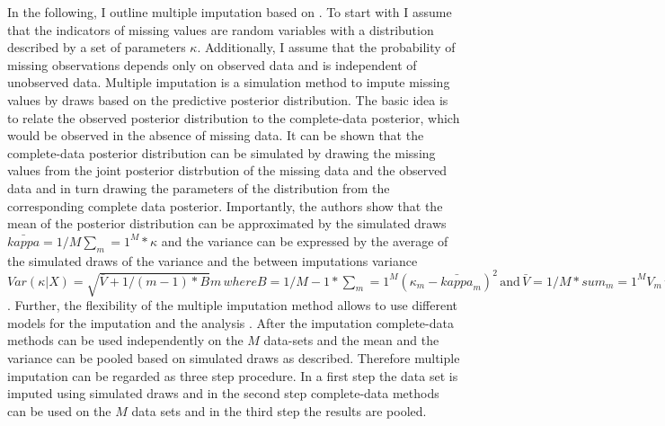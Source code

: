  \par
In the following, I outline multiple imputation based on \textcite[p.209-211]{Little:2002a}.
To start with I assume that the indicators of missing values are random variables with a distribution described by a set of parameters $\kappa$.
Additionally, I assume that the probability of missing observations depends only on observed data and is independent of unobserved data.
Multiple imputation is a  simulation method to impute missing values by draws based on the predictive posterior distribution.
The basic idea is to relate the observed posterior distribution to the complete-data posterior, which would be observed in the absence of missing data.
It can be shown that the complete-data posterior distribution can be simulated by drawing the missing values from the joint posterior distrbution of the missing data and the observed data
and in turn drawing the parameters of the distribution from the corresponding complete data posterior.
Importantly, the authors show that the mean of the posterior distribution can be approximated by the simulated draws $\bar{kappa}=1/M \sum_m=1^M *\kappa$  and the variance can be expressed by the average of the simulated draws of the variance and the between imputations variance $Var(\kappa|X)=\sqrt{\bar{V}+ 1/(m-1)*B}m \, where B=1/{M-1}*\sum_m=1^M(\kappa_m-\bar{kappa}_m)^2 \, \text{and} \,\bar{V}=1/M * sum_m=1^M V_m \, \text{with} V_M=Var{X_obs,X_mis^(d)}$.
Further, the flexibility of the multiple imputation method allows to use different models for the imputation and the analysis \textcite[p.217]{Little:2002a}.
After the imputation complete-data methods can be used independently on the $M$ data-sets and the mean and the variance can be pooled based on simulated draws as described.
Therefore multiple imputation can be regarded as three step procedure.
In a first step the data set is imputed using simulated draws and in the second step complete-data methods can be used on the $M$ data sets and in the third step the results are pooled.
\par
